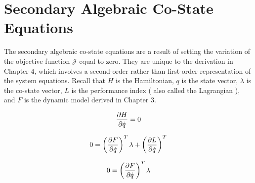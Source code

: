 \section{Secondary Algebraic Co-State Equations}

The secondary algebraic co-state equations are a result of setting the variation of  the objective function $\mathcal{  J  }$ equal to zero. They are unique to the derivation in Chapter 4, which involves a second-order rather than first-order representation of the system equations. Recall that $H$ is the Hamiltonian, $q$ is the state vector, $\lambda$ is the co-state vector, $L$ is the performance index ( also called the Lagrangian ), and $F$ is the dynamic model derived in Chapter 3.

\begin{equation}
    \frac{\partial H}{\partial \dot q} = 0
\end{equation}

\begin{equation}
0 = \left(\frac{\partial F}{\partial \dot q}\right)^T \lambda + \left(\frac{\partial L}{\partial \dot q}\right)^T
\end{equation}

\begin{equation}
    0 = \left(\frac{\partial F}{\partial \dot q}\right)^T \lambda
\end{equation}

